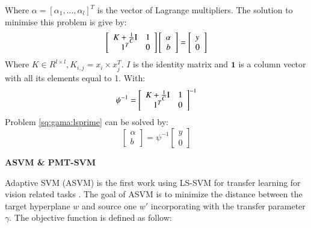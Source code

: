 Where $\alpha = [ \alpha_1,...,\alpha_l]^T $ is the vector of Lagrange multipliers. The solution to minimise this problem is give by:
\begin{equation}\label{eq:single:orgmatrix}
  \left[ {\begin{array}{*{20}{c}}
{K  + \frac{1}{C}{\rm I}}\\
1^T
\end{array}\begin{array}{*{20}{c}}
1\\
0
\end{array}} \right]\left[ {\begin{array}{*{20}{c}}
\alpha \\
b
\end{array}} \right] = \left[ \begin{array}{l}
y\\
0
\end{array} \right]
\end{equation}
Where $K \in R^{l \times l},K_{i,j}=x_i \times x_j^T$. $I$ is the identity matrix and $\mathbf{1}$ is a column vector with all its elements equal to 1. With:
\begin{equation}\label{eq:gama:psi}
\psi^{-1} = \left[ {\begin{array}{*{20}{c}}
{K  + \frac{1}{C}{\rm I}}\\
1^T
\end{array}\begin{array}{*{20}{c}}
1\\
0
\end{array}} \right]^{-1}
\end{equation}
Problem \eqref{sq:gama:lsprime} can be solved by:
\begin{equation}
\left[ {\begin{array}{*{20}{c}}
\alpha \\
b
\end{array}} \right] = \psi^{-1}\left[ \begin{array}{l}
y\\
0
\end{array} \right]
\end{equation}

\textbf{ASVM \& PMT-SVM}

Adaptive SVM (ASVM) is the first work using LS-SVM for transfer learning for vision related tasks \cite{yang2007adapting}. The goal of ASVM is to minimize the distance between the target hyperplane $w$ and source one $w'$ incorporating with the transfer parameter $\gamma$. The objective function is defined as follow:

